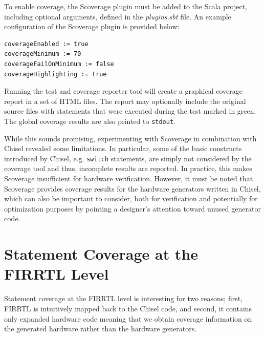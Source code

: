 \documentclass[conference]{IEEEtran}
\begin{document}
To enable coverage, the Scoverage plugin must be added to the Scala project, including optional arguments, defined in the \textit{plugins.sbt} file.
An example configuration of the Scoverage plugin is provided below:
\begin{verbatim}
coverageEnabled := true
coverageMinimum := 70
coverageFailOnMinimum := false
coverageHighlighting := true
\end{verbatim}
Running the test and coverage reporter tool will create a graphical coverage report in a set of HTML files. The report may optionally include the original source files with statements that were executed during the test marked in green. The global coverage results are also printed to \texttt{stdout}.

While this sounds promising, experimenting with Scoverage in combination with Chisel revealed some limitations. In particular, some of the basic constructs introduced by Chisel, e.g. \texttt{switch} statements, are simply not considered by the coverage tool and thus, incomplete results are reported. In practice, this makes Scoverage insufficient for hardware verification. However, it must be noted that Scoverage provides coverage results for the hardware generators written in Chisel, which can also be important to consider, both for verification and potentially for optimization purposes by pointing a designer's attention toward unused generator code.

\section{Statement Coverage at the FIRRTL Level}  
Statement coverage at the FIRRTL level is interesting for two reasons; first, FIRRTL is intuitively mapped back to the Chisel code, and second, it contains only expanded hardware code meaning that we obtain coverage information on the generated hardware rather than the hardware generators.%
\end{document}
